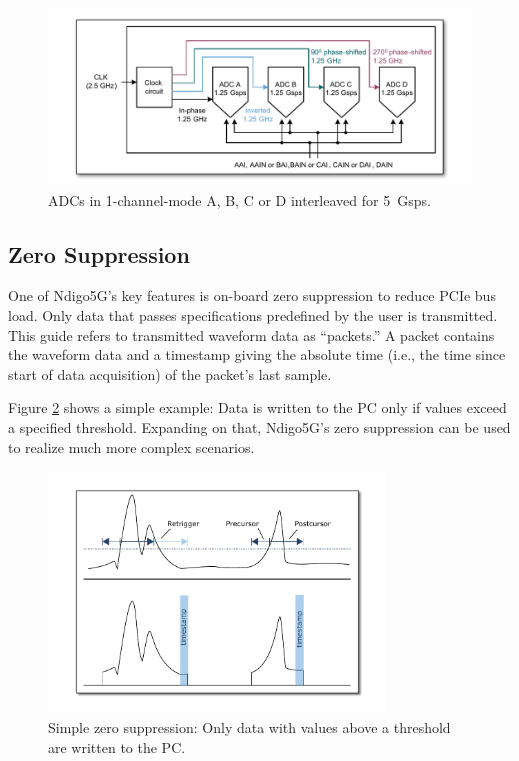 \begin{figure}
    \centering
    \includegraphics[width=\textwidth]{figures/1ChannelMode.pdf}
    \caption{ADCs in 1-channel-mode A, B, C or D interleaved for 5~Gsps.\label{fig:1ChannelMode}}
\end{figure}

\clearpage
\subsection{Zero Suppression}

One of Ndigo5G's key features is on-board zero suppression to reduce PCIe bus load. Only data that passes specifications predefined by the user is transmitted. This guide refers to transmitted waveform data as ``packets.'' A packet contains the waveform data and a timestamp giving the absolute time (i.e., the time since start of data acquisition) of the packet's last sample.\par Figure \ref{fig:ZeroSupp} shows a simple example: Data is written to the PC only if values exceed a specified threshold. Expanding on that, Ndigo5G's zero suppression can be used to realize much more complex scenarios.

\begin{figure}[hb]
    \centering
    \includegraphics[width=0.8\textwidth]{figures/ZeroSupp.pdf}
    \caption{Simple zero suppression: Only data with values above a threshold are written to the PC.\label{fig:ZeroSupp}}
\end{figure}


